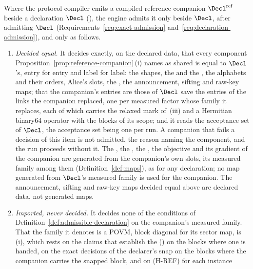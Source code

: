 \begin{requirement}\label{req:companion-admission}
Where the protocol compiler emits a compiled reference companion
$\Decl^{\mathrm{ref}}$ beside a declaration $\Decl$
(), the engine
admits it only beside $\Decl$, after admitting $\Decl$
(Requirements~\ref{req:exact-admission} and~\ref{req:declaration-admission}),
and only as follows.
\begin{enumerate}[label=(\roman*),leftmargin=2.4em]
\item \emph{Decided equal.} It decides exactly, on the declared data, that
  every component Proposition~\ref{prop:reference-companion}\,(i) names as
  shared is equal to $\Decl$'s, entry for entry and label for label: the
  shapes, the  and the , the
  alphabets and their orders, Alice's slots, the , the
  announcement, sifting and raw-key maps; that the companion's entries are
  those of $\Decl$ save the entries of the links the companion replaced, one
  per measured factor whose family it replaces, each of which carries the relaxed mark of
  \,(iii) and a Hermitian binary64
  operator with the blocks of its scope; and it reads the acceptance set of
  $\Decl$, the acceptance set being one per run. A companion that fails a
  decision of this item is not admitted, the reason naming the component,
  and the run proceeds without it. The , the
  , the , the
  objective and its gradient of the companion are generated from the
  companion's own slots, its measured family among them
  (Definition~\ref{def:maps}), as for any declaration; no map generated from
  $\Decl$'s measured family is used for the companion. The announcement,
  sifting and raw-key maps decided equal above are declared data, not
  generated maps.
\item \emph{Imported, never decided.} It decides none of the conditions of
  Definition~\ref{def:admissible-declaration} on the companion's measured
  family. That the family it denotes is a POVM, block diagonal for its
  sector map, is \,(i), which rests
  on the claims that establish the 
  () on the blocks where one is
  handed, on the exact decisions of the declarer's snap on the blocks where
  the companion carries the snapped block, and on (H-REF) for each instance

\end{enumerate}
\end{requirement}
